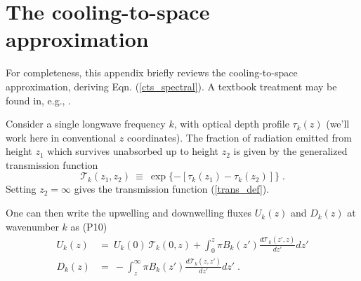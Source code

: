 \documentclass[10pt]{article}
\newcommand{\beqn}{\begin{equation}}
\newcommand{\eeqn}{\end{equation}}
\newcommand{\eqnref}[1]{(\ref{#1})}
\newcommand{\n}{\nonumber}
\newcommand{\der}[2]{\ensuremath{\frac{d #1}{d #2}}}
\newcommand{\trans}{\ensuremath{\mathcal{T}}}
\newcommand{\pierre}{P10}
\newcommand{\tauk}{\ensuremath{\tau_k}}
\begin{document}

	\section{The cooling-to-space approximation} \label{appendix_cts}
For completeness, this appendix briefly reviews the cooling-to-space approximation, deriving Eqn. \eqnref{cts_spectral}. A textbook treatment may be found in, e.g., \cite{thomas2002}.

Consider a single longwave frequency $k$, with optical depth profile $\tauk(z)$ (we'll work here in conventional $z$ coordinates). The fraction of radiation emitted from height $z_1$ which survives unabsorbed up to height $z_2$ is given by the generalized transmission function
	\beqn
		\trans_k(z_1,z_2)\  \equiv\ \exp\{-[\tauk(z_1) -\tauk(z_2)]\} \; .
		\n
	\eeqn
Setting $z_2=\infty$ gives the transmission function \eqnref{trans_def}.

One can then write the upwelling and downwelling fluxes $U_k(z)$ and $D_k(z)$ at wavenumber $k$ as (\pierre)
	\begin{align}
		U_k(z) & =\ U_k(0)\,\trans_k(0,z) + \int_0^z \pi B_k(z') \der{\trans_k(z',z)}{z'}dz' \n \\
		D_k(z) & =\ - \int_z^\infty \pi B_k(z') \der{\trans_k(z,z')}{z'}dz' \; . \n
	\end{align}
\end{document}
